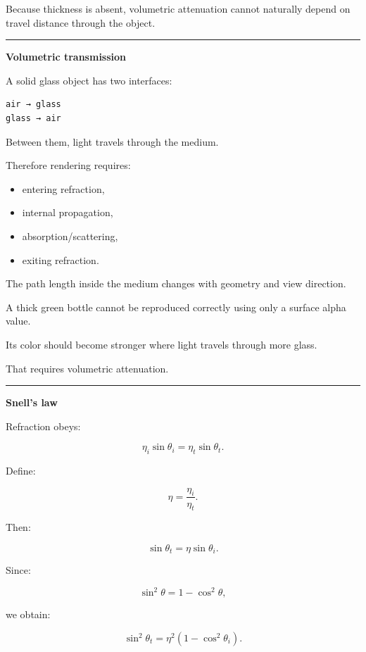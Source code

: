 Because thickness is absent, volumetric attenuation cannot naturally depend on travel distance through the object.

\begin{center}\rule{0.5\linewidth}{0.5pt}\end{center}

\textbf{Volumetric transmission}

A solid glass object has two interfaces:

\begin{verbatim}
air → glass
glass → air
\end{verbatim}

Between them, light travels through the medium.

Therefore rendering requires:

\begin{itemize}
\tightlist
\item
  entering refraction,
\item
  internal propagation,
\item
  absorption/scattering,
\item
  exiting refraction.
\end{itemize}

The path length inside the medium changes with geometry and view direction.

A thick green bottle cannot be reproduced correctly using only a surface alpha value.

Its color should become stronger where light travels through more glass.

That requires volumetric attenuation.

\begin{center}\rule{0.5\linewidth}{0.5pt}\end{center}

\textbf{Snell's law}

Refraction obeys:

\[
\boxed{
\eta_i\sin\theta_i
=
\eta_t\sin\theta_t.
}
\]

Define:

\[
\eta=
\frac{\eta_i}{\eta_t}.
\]

Then:

\[
\sin\theta_t=
\eta\sin\theta_i.
\]

Since:

\[
\sin^2\theta
=
1-\cos^2\theta,
\]

we obtain:

\[
\sin^2\theta_t
=
\eta^2
(1-\cos^2\theta_i).
\]

